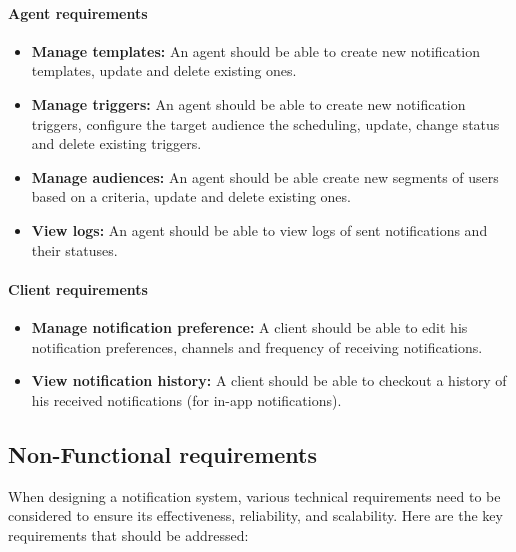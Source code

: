 \paragraph{Agent requirements}
\label{agent-req}
\begin{itemize}
      \item \textbf{Manage templates:} An agent should be able to create new notification templates, update and
            delete existing ones.
      \item \textbf{Manage triggers:} An agent should be able to create new notification triggers, configure
            the target audience the scheduling, update, change status and delete existing triggers.
      \item \textbf{Manage audiences:} An agent should be able create new segments of users based on a
            criteria, update and delete existing ones.
      \item \textbf{View logs:} An agent should be able to view logs of sent notifications and their statuses.
\end{itemize}

\paragraph{Client requirements}
\label{client-req}
\begin{itemize}
      \item \textbf{Manage notification preference:} A client should be able to edit his notification preferences,
            channels and frequency of receiving notifications.
      \item \textbf{View notification history:} A client should be able to checkout a history of his received
            notifications (for in-app notifications).
\end{itemize}

\subsection{Non-Functional requirements}
\label{nfr}
When designing a notification system, various technical requirements need to be considered to ensure
its effectiveness, reliability, and scalability. Here are the key requirements that should be addressed:

